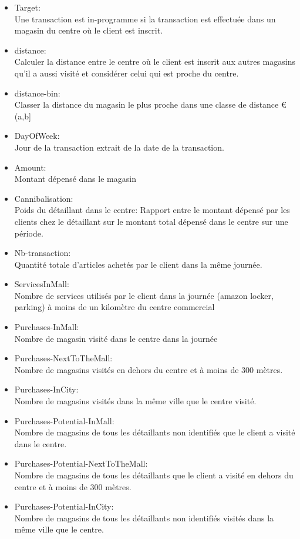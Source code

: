 \begin{itemize}
\item Target: \\
Une transaction est in-programme si la transaction est effectuée dans un magasin du centre où le client est inscrit.
\item distance: \\
Calculer la distance entre le centre où le client est inscrit 
aux autres magasins qu'il a aussi visité et considérer celui qui est proche du centre.
\item distance-bin: \\
Classer la distance du magasin le plus proche dans une classe de distance €(a,b]
\item DayOfWeek:\\ 
Jour de la transaction extrait de la date de la transaction.
\item Amount:\\
Montant dépensé dans le magasin
\item Cannibalisation:\\
Poids du détaillant dans le centre: Rapport entre le montant dépensé par les clients chez le détaillant sur le montant total dépensé dans le centre sur une période.
\item Nb-transaction:\\
Quantité totale d'articles achetés par le client dans la même journée.
\item ServicesInMall:\\
Nombre de services utilisés par le client dans la journée (amazon locker, parking) à moins de un kilomètre du centre commercial
\item Purchases-InMall:\\
Nombre de magasin visité dans le centre dans la journée
\item Purchases-NextToTheMall:\\
Nombre de magasins visités en dehors du centre et à moins de 300 mètres.
\item Purchases-InCity:\\
Nombre de magasins visités dans la même ville que le centre visité.
\item Purchases-Potential-InMall:\\
Nombre de magasins de tous les détaillants non identifiés que le client a visité dans le centre.
\item Purchases-Potential-NextToTheMall:\\
Nombre de magasins de tous les détaillants que le client a visité en dehors du centre et à moins de 300 mètres.
\item Purchases-Potential-InCity:\\
Nombre de magasins de tous les détaillants non identifiés visités dans la même ville que le centre.
\end{itemize}

